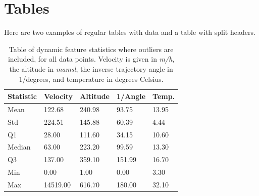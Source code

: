 \section{Tables}

Here are two examples of regular tables with data and a table with split headers.

\begin{table}[ht!]
\centering
    \begin{tabular}{ m{3cm} m{2.5cm} m{2.5cm} m{2.5cm} m{2cm} } 
    \toprule
    \toprule
    \textbf{Statistic} & \textbf{Velocity} & \textbf{Altitude} & \textbf{1/Angle} & \textbf{Temp.} \\
    \midrule
    Mean    & 122.68    & 240.98   & 93.75     & 13.95 \\[1.3ex]
    Std     & 224.51    & 145.88   & 60.39     & 4.44  \\[1.3ex]
    Q1      & 28.00     & 111.60   & 34.15     & 10.60 \\[1.3ex]
    Median  & 63.00     & 223.20   & 99.59     & 13.30 \\[1.3ex]
    Q3      & 137.00    & 359.10   & 151.99    & 16.70 \\[1.3ex]
    Min     & 0.00      & 1.00     & 0.00      & 3.30  \\[1.3ex]
    Max     & 14519.00  & 616.70   & 180.00    & 32.10 \\[1.3ex]
    \bottomrule
    \bottomrule
    \end{tabular}
\caption[Dynamic feature statistics with outliers]{Table of dynamic feature statistics where outliers are included, for all data points. Velocity is given in \textit{m/h}, the altitude in \textit{mamsl}, the inverse trajectory angle in 1/degrees, and temperature in degrees Celsius.}
\label{table:stat_fliers}
\end{table}


